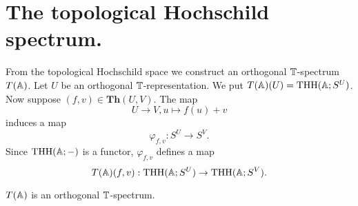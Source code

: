 \section{The topological Hochschild spectrum.}
From the topological Hochschild space we construct an orthogonal $\mathbb{T}$-spectrum $T(\mathbb{A})$. Let $U$ be an orthogonal $\mathbb{T}$-representation.
We put $T(\mathbb{A})(U)=\mathrm{THH}(\mathbb{A};S^{U})$. Now suppose $(f,v)\in \mathbf{Th}(U,V)$.
The map
$$U\rightarrow V, u\mapsto f(u) + v$$
induces a map
$$\varphi_{f,v}:S^U\rightarrow S^V.$$
Since $\text{THH}(\mathbb{A};-)$ is a functor,
$\varphi_{f,v}$ defines a map 
$$T(\mathbb{A})(f,v):\text{THH}(\mathbb{A};S^U)\rightarrow \text{THH}(\mathbb{A};S^V).$$

\begin{prop}
$T(\mathbb{A})$ is an orthogonal $\mathbb{T}$-spectrum.
\end{prop}

